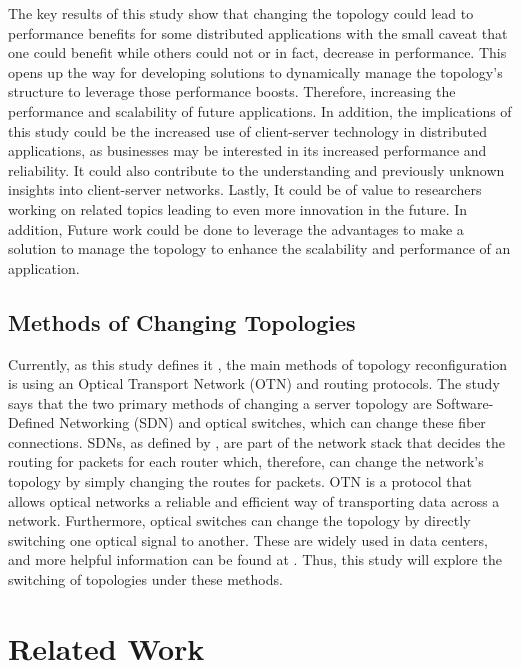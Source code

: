 The key results of this study show that changing the topology could lead to performance benefits for some distributed applications with the small caveat that one could benefit while others could not or in fact, decrease in performance. This opens up the way for developing solutions to dynamically manage the topology's structure to leverage those performance boosts. Therefore, increasing the performance and scalability of future applications. In addition, the implications of this study could be the increased use of client-server technology in distributed applications, as businesses may be interested in its increased performance and reliability. It could also contribute to the understanding and previously unknown insights into client-server networks. Lastly, It could be of value to researchers working on related topics leading to even more innovation in the future. In addition, Future work could be done to leverage the advantages to make a solution to manage the topology to enhance the scalability and performance of an application.




\subsection{Methods of Changing Topologies}

\indent Currently, as this study defines it \cite{hall_survey_2021}, the main methods of topology reconfiguration is using an Optical Transport Network (OTN) and routing protocols. The study says that the two primary methods of changing a server topology are Software-Defined Networking (SDN) and optical switches, which can change these fiber connections. SDNs, as defined by \cite{kurose2021computer}, are part of the network stack that decides the routing for packets for each router which, therefore, can change the network's topology by simply changing the routes for packets. OTN is a protocol that allows optical networks a reliable and efficient way of transporting data across a network. Furthermore, optical switches can change the topology by directly switching one optical signal to another. These are widely used in data centers, and more helpful information can be found at \cite{nandi2022optical}. Thus, this study will explore the switching of topologies under these methods.



\section{Related Work}

